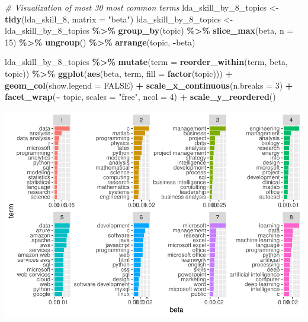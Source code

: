\documentclass[11pt,]{article}
\newenvironment{Shaded}{\begin{snugshade}}{\end{snugshade}}
\newcommand{\AttributeTok}[1]{\textcolor[rgb]{0.13,0.29,0.53}{#1}}
\newcommand{\CommentTok}[1]{\textcolor[rgb]{0.56,0.35,0.01}{\textit{#1}}}
\newcommand{\ConstantTok}[1]{\textcolor[rgb]{0.56,0.35,0.01}{#1}}
\newcommand{\DecValTok}[1]{\textcolor[rgb]{0.00,0.00,0.81}{#1}}
\newcommand{\FunctionTok}[1]{\textcolor[rgb]{0.13,0.29,0.53}{\textbf{#1}}}
\newcommand{\NormalTok}[1]{#1}
\newcommand{\OtherTok}[1]{\textcolor[rgb]{0.56,0.35,0.01}{#1}}
\newcommand{\SpecialCharTok}[1]{\textcolor[rgb]{0.81,0.36,0.00}{\textbf{#1}}}
\newcommand{\StringTok}[1]{\textcolor[rgb]{0.31,0.60,0.02}{#1}}
\begin{document}
\begin{Shaded}
\begin{Highlighting}[]
\CommentTok{\# Visualization of most 30 most common terms}
\NormalTok{lda\_skill\_by\_8\_topics }\OtherTok{\textless{}{-}} \FunctionTok{tidy}\NormalTok{(lda\_skill\_8, }\AttributeTok{matrix =} \StringTok{"beta"}\NormalTok{)}
\NormalTok{lda\_skill\_by\_8\_topics }\OtherTok{\textless{}{-}}\NormalTok{ lda\_skill\_by\_8\_topics }\SpecialCharTok{\%\textgreater{}\%} 
  \FunctionTok{group\_by}\NormalTok{(topic) }\SpecialCharTok{\%\textgreater{}\%} 
  \FunctionTok{slice\_max}\NormalTok{(beta, }\AttributeTok{n =} \DecValTok{15}\NormalTok{) }\SpecialCharTok{\%\textgreater{}\%} 
  \FunctionTok{ungroup}\NormalTok{() }\SpecialCharTok{\%\textgreater{}\%} 
  \FunctionTok{arrange}\NormalTok{(topic, }\SpecialCharTok{{-}}\NormalTok{beta)}

\NormalTok{lda\_skill\_by\_8\_topics }\SpecialCharTok{\%\textgreater{}\%} 
  \FunctionTok{mutate}\NormalTok{(}\AttributeTok{term =} \FunctionTok{reorder\_within}\NormalTok{(term, beta, topic)) }\SpecialCharTok{\%\textgreater{}\%} 
  \FunctionTok{ggplot}\NormalTok{(}\FunctionTok{aes}\NormalTok{(beta, term, }\AttributeTok{fill =} \FunctionTok{factor}\NormalTok{(topic))) }\SpecialCharTok{+}
  \FunctionTok{geom\_col}\NormalTok{(}\AttributeTok{show.legend =} \ConstantTok{FALSE}\NormalTok{) }\SpecialCharTok{+}
  \FunctionTok{scale\_x\_continuous}\NormalTok{(}\AttributeTok{n.breaks =} \DecValTok{3}\NormalTok{) }\SpecialCharTok{+}
  \FunctionTok{facet\_wrap}\NormalTok{(}\SpecialCharTok{\textasciitilde{}}\NormalTok{ topic, }\AttributeTok{scales =} \StringTok{"free"}\NormalTok{, }\AttributeTok{ncol =} \DecValTok{4}\NormalTok{) }\SpecialCharTok{+}
  \FunctionTok{scale\_y\_reordered}\NormalTok{()}
\end{Highlighting}
\end{Shaded}

\includegraphics{figs/skill-lda-8.pdf}
\end{document}
